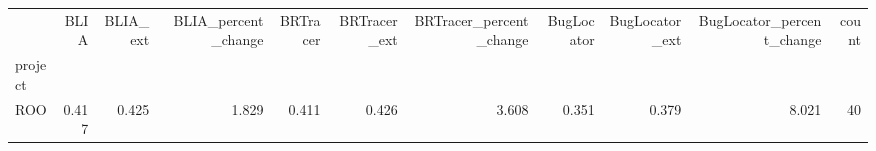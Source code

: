 \begin{tabular}{lrrrrrrrrrr}
\toprule
{} &  BLIA &  BLIA\_ext &  BLIA\_percent\_change &  BRTracer &  BRTracer\_ext &  BRTracer\_percent\_change &  BugLocator &  BugLocator\_ext &  BugLocator\_percent\_change &  count \\
project &       &           &                      &           &               &                          &             &                 &                            &        \\
\midrule
ROO     & 0.417 &     0.425 &                1.829 &     0.411 &         0.426 &                    3.608 &       0.351 &           0.379 &                      8.021 &     40 \\
\bottomrule
\end{tabular}
